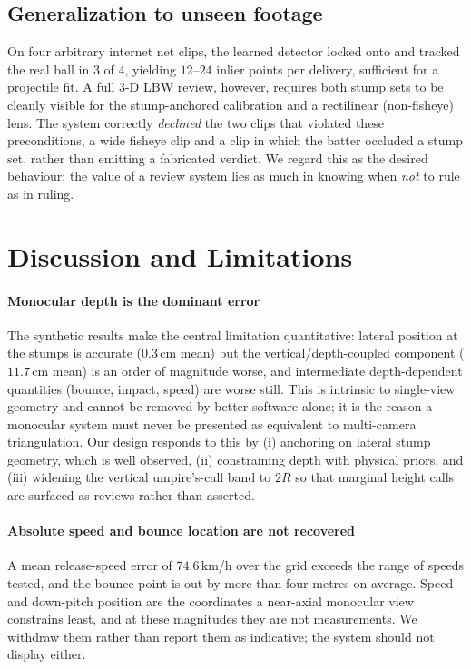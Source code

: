 \documentclass[journal]{IEEEtran}
\begin{document}
\subsection{Generalization to unseen footage}
On four arbitrary internet net clips, the learned detector locked onto and
tracked the real ball in $3$ of $4$, yielding $12$--$24$ inlier points per
delivery, sufficient for a projectile fit. A full 3-D LBW review, however,
requires both stump sets to be cleanly visible for the stump-anchored
calibration and a rectilinear (non-fisheye) lens. The system correctly
\emph{declined} the two clips that violated these preconditions, a wide
fisheye clip and a clip in which the batter occluded a stump set, rather than
emitting a fabricated verdict. We regard this as the desired behaviour: the
value of a review system lies as much in knowing when \emph{not} to rule as in
ruling.

\section{Discussion and Limitations}
\label{sec:discussion}

\paragraph*{Monocular depth is the dominant error} The synthetic results make
the central limitation quantitative: lateral position at the stumps is accurate
($0.3$\,cm mean) but the vertical/depth-coupled component ($11.7$\,cm mean) is
an order of magnitude worse, and intermediate depth-dependent quantities
(bounce, impact, speed) are worse still. This is intrinsic to single-view
geometry and cannot be removed by better software alone; it is the reason a
monocular system must never be presented as equivalent to multi-camera
triangulation. Our design responds to this by (i) anchoring on lateral stump
geometry, which is well observed, (ii) constraining depth with physical priors,
and (iii) widening the vertical umpire's-call band to $2R$ so that marginal
height calls are surfaced as reviews rather than asserted.

\paragraph*{Absolute speed and bounce location are not recovered} A mean
release-speed error of $74.6$\,km/h over the grid exceeds the range of speeds
tested, and the bounce point is out by more than four metres on average. Speed
and down-pitch position are the coordinates a near-axial monocular view
constrains least, and at these magnitudes they are not measurements. We withdraw
them rather than report them as indicative; the system should not display either.
\end{document}
